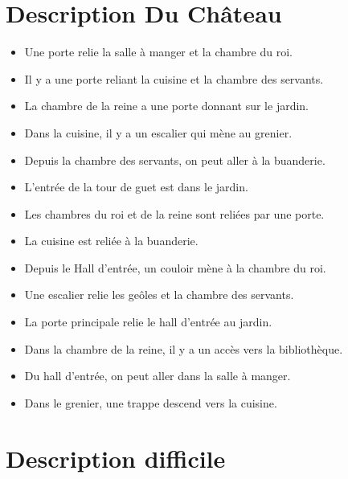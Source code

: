 \documentclass{article}
\begin{document}
\newpage
\section{Description Du Château}
\begin{itemize}
\item Une porte relie la salle à manger et la chambre du roi.
\item Il y a une porte reliant la cuisine et la chambre des servants.
\item La chambre de la reine a une porte donnant sur le jardin.
\item Dans la cuisine, il y a un escalier qui mène au grenier.
\item Depuis la chambre des servants, on peut aller à la buanderie.
\item L'entrée de la tour de guet est dans le jardin.
\item Les chambres du roi et de la reine sont reliées par une porte.
\item La cuisine est reliée à la buanderie.
\item Depuis le Hall d'entrée, un couloir mène à la chambre du roi.
\item Une escalier relie les geôles et la chambre des servants.
\item La porte principale relie le hall d'entrée au jardin.
\item Dans la chambre de la reine, il y a un accès vers la bibliothèque.
\item Du hall d'entrée, on peut aller dans la salle à manger.
\item Dans le grenier, une trappe descend vers la cuisine.
\end{itemize}

\newpage
\section{Description difficile}
\end{document}
